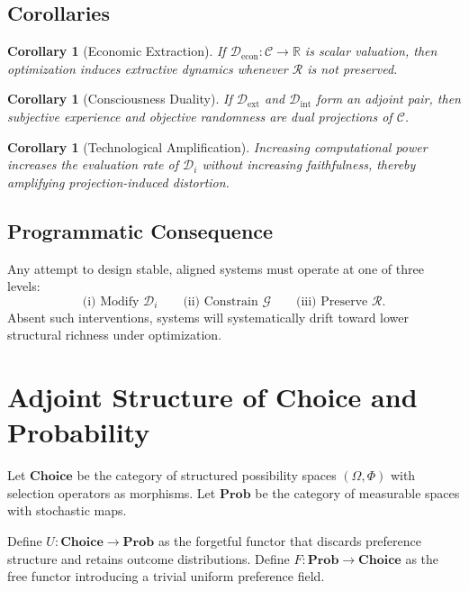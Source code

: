 \documentclass[11pt,a4paper]{article}
\newtheorem{corollary}[theorem]{Corollary}
\theoremstyle{definition}
\theoremstyle{remark}
\begin{document}
\subsection{Corollaries}

\begin{corollary}[Economic Extraction]
If $\mathcal{D}_{\mathrm{econ}} : \mathcal{C} \to \mathbb{R}$ is scalar valuation, then optimization induces extractive dynamics whenever $\mathcal{R}$ is not preserved.
\end{corollary}

\begin{corollary}[Consciousness Duality]
If $\mathcal{D}_{\mathrm{ext}}$ and $\mathcal{D}_{\mathrm{int}}$ form an adjoint pair, then subjective experience and objective randomness are dual projections of $\mathcal{C}$.
\end{corollary}

\begin{corollary}[Technological Amplification]
Increasing computational power increases the evaluation rate of $\mathcal{D}_i$ without increasing faithfulness, thereby amplifying projection-induced distortion.
\end{corollary}

\subsection{Programmatic Consequence}

Any attempt to design stable, aligned systems must operate at one of three levels:
\[
\text{(i)\ Modify } \mathcal{D}_i \qquad \text{(ii)\ Constrain } \mathcal{G} \qquad \text{(iii)\ Preserve } \mathcal{R}.
\]
Absent such interventions, systems will systematically drift toward lower structural richness under optimization.

\section{Adjoint Structure of Choice and Probability}
\label{app:adjoint}

Let $\mathbf{Choice}$ be the category of structured possibility spaces $(\Omega, \Phi)$ with selection operators as morphisms. Let $\mathbf{Prob}$ be the category of measurable spaces with stochastic maps.

Define $U : \mathbf{Choice} \to \mathbf{Prob}$ as the forgetful functor that discards preference structure and retains outcome distributions. Define $F : \mathbf{Prob} \to \mathbf{Choice}$ as the free functor introducing a trivial uniform preference field.
\end{document}
